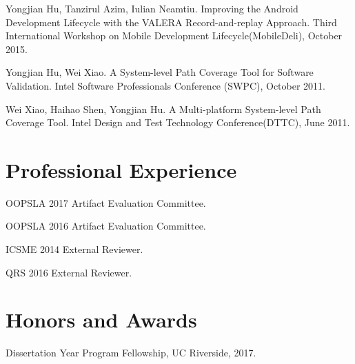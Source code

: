 \documentclass[margin,line]{res}
\begin{document}
\begin{resume}
Yongjian Hu, Tanzirul Azim, Iulian Neamtiu. Improving the Android Development Lifecycle with the VALERA Record-and-replay Approach.
Third International Workshop on Mobile Development Lifecycle(MobileDeli), October 2015.


Yongjian Hu, Wei Xiao. A System-level Path Coverage Tool for Software Validation.
Intel Software Professionals Conference (SWPC), October 2011.

Wei Xiao, Haihao Shen, Yongjian Hu. A Multi-platform System-level Path Coverage Tool.
Intel Design and Test Technology Conference(DTTC), June 2011.







\section{\sc Professional Experience}

OOPSLA 2017 Artifact Evaluation Committee.

\vspace*{-2.5mm}
OOPSLA 2016 Artifact Evaluation Committee.

\vspace*{-2.5mm}
ICSME 2014 External Reviewer.

\vspace*{-2.5mm}
QRS 2016 External Reviewer.

\vspace*{1.5cm}

\section{\sc Honors and Awards} 
Dissertation Year Program Fellowship, UC Riverside, 2017.


\end{resume}
\end{document}
